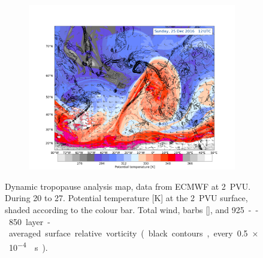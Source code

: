 \begin{figure}[t!]
	\begin{subfigure}[b]{\textwidth}
		\includegraphics[trim={4.2cm 0cm 4.3cm 36.8cm},clip,
		width=\textwidth]{./fig_DynTropo/20161225_12}
	\end{subfigure}
\caption{Dynamic tropopause analysis map, data from ECMWF at \SI{2}{PVU}. During \num{20} to \SI{27}{\dec}. Potential temperature [K] at the \SI{2}{PVU} surface, shaded according to the colour bar. Total wind, barbs [\SI{}{\mPs}], and \SI{925}--\SI{850}{\hPa} layer-averaged surface relative vorticity (black contours, every \SI{.5e-4}{\per\second}).  }\label{fig:DynTropo}
\end{figure}
%
